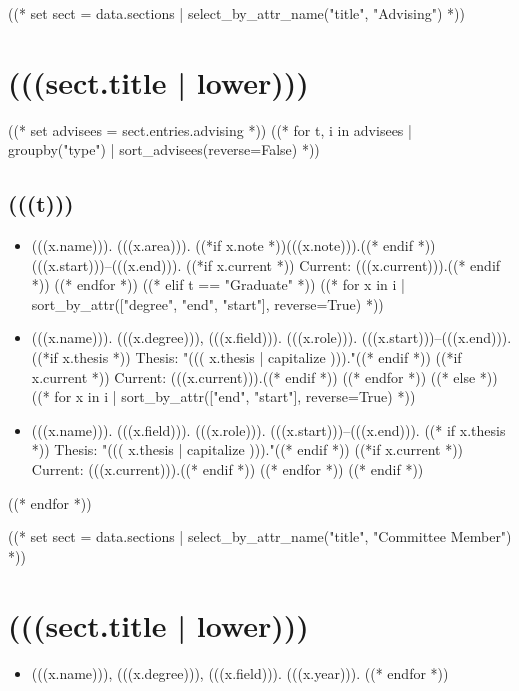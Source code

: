 \documentclass[11pt,article,oneside]{memoir}
\begin{document}
((* set sect = data.sections | select_by_attr_name("title", "Advising") *))
\section{(((sect.title | lower)))}

\mbox{}\vspace{-\dimexpr\baselineskip\relax}

\vspace{\baselineskip}
((* set advisees = sect.entries.advising *))
((* for t, i in advisees | groupby("type") | sort_advisees(reverse=False) *))
\subsection{(((t)))}
\begin{itemize}[label={}]
((* if t == "Postdoctoral" *))
((* for x in i | sort_by_attr(["end", "start"], reverse=True) *))
\item (((x.name))). (((x.area))). ((*if x.note *))(((x.note))).((* endif *)) (((x.start)))--(((x.end))). ((*if x.current *)) Current: (((x.current))).((* endif *))
((* endfor *))
((* elif t == "Graduate" *))
((* for x in i | sort_by_attr(["degree", "end", "start"], reverse=True) *))
\item (((x.name))). (((x.degree))), (((x.field))). (((x.role))). (((x.start)))--(((x.end))). ((*if x.thesis *)) Thesis: "((( x.thesis | capitalize )))."((* endif *)) ((*if x.current *)) Current: (((x.current))).((* endif *))
((* endfor *))
((* else *))
((* for x in i | sort_by_attr(["end", "start"], reverse=True) *))
\item (((x.name))). (((x.field))). (((x.role))). (((x.start)))--(((x.end))). ((* if x.thesis *)) Thesis: "((( x.thesis | capitalize )))."((* endif *)) ((*if x.current *)) Current: (((x.current))).((* endif *))
((* endfor *))
((* endif *))
\end{itemize}
((* endfor *))

((* set sect = data.sections | select_by_attr_name("title", "Committee Member") *))
\section{(((sect.title | lower)))}

\mbox{}\vspace{-\dimexpr\baselineskip\relax}

\vspace{\baselineskip}
\begin{itemize}[label={}]
((* for x in sect.entries.member | sort_by_attr(["year"], reverse=True) *))
\item (((x.name))), (((x.degree))), (((x.field))). (((x.year))).
((* endfor *))
\end{itemize}
\end{document}
